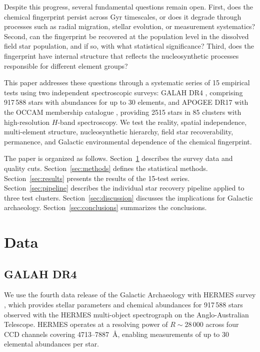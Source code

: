 \documentclass[fleqn,usenatbib]{mnras}
\begin{document}
Despite this progress, several fundamental questions remain open.
First, does the chemical fingerprint persist across Gyr timescales, or does it degrade through processes such as radial migration, stellar evolution, or measurement systematics?
Second, can the fingerprint be recovered at the population level in the dissolved field star population, and if so, with what statistical significance?
Third, does the fingerprint have internal structure that reflects the nucleosynthetic processes responsible for different element groups?

This paper addresses these questions through a systematic series of 15 empirical tests using two independent spectroscopic surveys: GALAH DR4 \citep{Buder2024}, comprising 917\,588 stars with abundances for up to 30 elements, and APOGEE DR17 \citep{Abdurrouf2022} with the OCCAM membership catalogue \citep{Donor2020}, providing 2515 stars in 85 clusters with high-resolution $H$-band spectroscopy.
We test the reality, spatial independence, multi-element structure, nucleosynthetic hierarchy, field star recoverability, permanence, and Galactic environmental dependence of the chemical fingerprint.

The paper is organized as follows.
Section~\ref{sec:data} describes the survey data and quality cuts.
Section~\ref{sec:methods} defines the statistical methods.
Section~\ref{sec:results} presents the results of the 15-test series.
Section~\ref{sec:pipeline} describes the individual star recovery pipeline applied to three test clusters.
Section~\ref{sec:discussion} discusses the implications for Galactic archaeology.
Section~\ref{sec:conclusions} summarizes the conclusions.


\section{Data}
\label{sec:data}

\subsection{GALAH DR4}
\label{sec:galah}

We use the fourth data release of the Galactic Archaeology with HERMES survey \citep[GALAH DR4;][]{Buder2024}, which provides stellar parameters and chemical abundances for 917\,588 stars observed with the HERMES multi-object spectrograph on the Anglo-Australian Telescope.
HERMES operates at a resolving power of $R \sim 28\,000$ across four CCD channels covering 4713--7887~\AA, enabling measurements of up to 30 elemental abundances per star.
\end{document}
